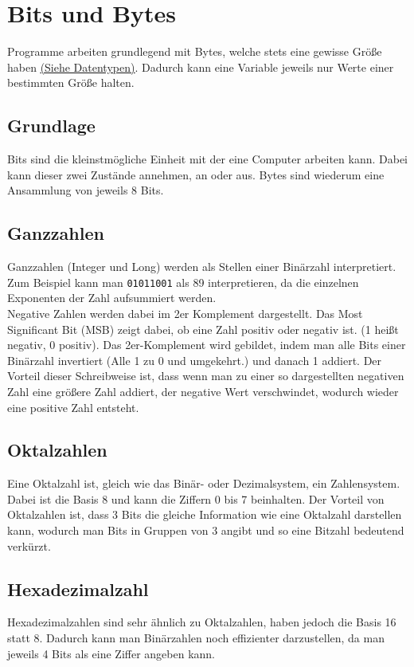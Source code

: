 \documentclass{article}
\begin{document}
	  \section{Bits und Bytes}
	  Programme arbeiten grundlegend mit Bytes, welche stets eine gewisse Größe haben \hyperref[sec:Datentypen]{\underline{(Siehe Datentypen)}}. Dadurch kann eine Variable jeweils nur Werte einer bestimmten Größe halten. \\
	  \subsection{Grundlage}
	  Bits sind die kleinstmögliche Einheit mit der eine Computer arbeiten kann. Dabei kann dieser zwei Zustände annehmen, an oder aus. Bytes sind wiederum eine Ansammlung von jeweils 8 Bits. \\
	  \subsection{Ganzzahlen}
	  Ganzzahlen (Integer und Long) werden als Stellen einer Binärzahl interpretiert. \\
	  Zum Beispiel kann man \verb|01011001| als 89 interpretieren, da die einzelnen Exponenten der Zahl aufsummiert werden. \\
	  Negative Zahlen werden dabei im 2er Komplement dargestellt. Das Most Significant Bit (MSB) zeigt dabei, ob eine Zahl positiv oder negativ ist. (1 heißt negativ, 0 positiv). Das 2er-Komplement wird gebildet, indem man alle Bits einer Binärzahl invertiert (Alle 1 zu 0 und umgekehrt.) und danach 1 addiert. Der Vorteil dieser Schreibweise ist, dass wenn man zu einer so dargestellten negativen Zahl eine größere Zahl addiert, der negative Wert verschwindet, wodurch wieder eine positive Zahl entsteht. 
	  \subsection{Oktalzahlen}
	  Eine Oktalzahl ist, gleich wie das Binär- oder Dezimalsystem, ein Zahlensystem. Dabei ist die Basis 8 und kann die Ziffern 0 bis 7 beinhalten. Der Vorteil von Oktalzahlen ist, dass 3 Bits die gleiche Information wie eine Oktalzahl darstellen kann, wodurch man Bits in Gruppen von 3 angibt und so eine Bitzahl bedeutend verkürzt.
	  \subsection{Hexadezimalzahl}
	  Hexadezimalzahlen sind sehr ähnlich zu Oktalzahlen, haben jedoch die Basis 16 statt 8. Dadurch kann man Binärzahlen noch effizienter darzustellen, da man jeweils 4 Bits als eine Ziffer angeben kann.
\end{document}
